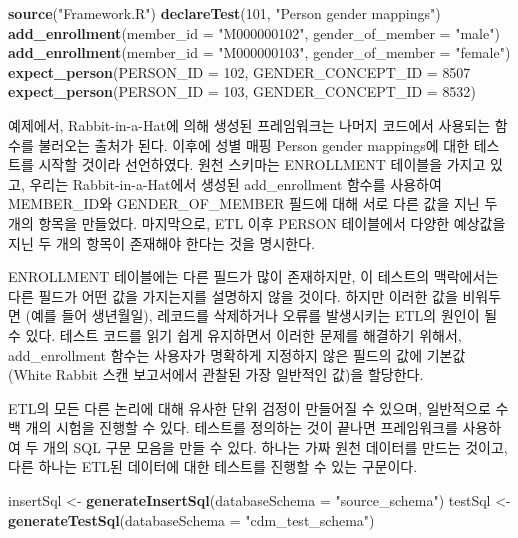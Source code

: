 \documentclass[10.5pt]{book}
\newenvironment{Shaded}{\begin{snugshade}}{\end{snugshade}}
\newcommand{\KeywordTok}[1]{\textcolor[rgb]{0.13,0.29,0.53}{\textbf{#1}}}
\newcommand{\DataTypeTok}[1]{\textcolor[rgb]{0.13,0.29,0.53}{#1}}
\newcommand{\DecValTok}[1]{\textcolor[rgb]{0.00,0.00,0.81}{#1}}
\newcommand{\StringTok}[1]{\textcolor[rgb]{0.31,0.60,0.02}{#1}}
\newcommand{\NormalTok}[1]{#1}
\theoremstyle{definition}
\theoremstyle{definition}
\theoremstyle{definition}
\theoremstyle{remark}
\begin{document}
\begin{Shaded}
\begin{Highlighting}[]
\KeywordTok{source}\NormalTok{(}\StringTok{"Framework.R"}\NormalTok{)}
\KeywordTok{declareTest}\NormalTok{(}\DecValTok{101}\NormalTok{, }\StringTok{"Person gender mappings"}\NormalTok{)}
\KeywordTok{add_enrollment}\NormalTok{(}\DataTypeTok{member_id =} \StringTok{"M000000102"}\NormalTok{, }\DataTypeTok{gender_of_member =} \StringTok{"male"}\NormalTok{)}
\KeywordTok{add_enrollment}\NormalTok{(}\DataTypeTok{member_id =} \StringTok{"M000000103"}\NormalTok{, }\DataTypeTok{gender_of_member =} \StringTok{"female"}\NormalTok{)}
\KeywordTok{expect_person}\NormalTok{(}\DataTypeTok{PERSON_ID =} \DecValTok{102}\NormalTok{, }\DataTypeTok{GENDER_CONCEPT_ID =} \DecValTok{8507}
\KeywordTok{expect_person}\NormalTok{(}\DataTypeTok{PERSON_ID =} \DecValTok{103}\NormalTok{, }\DataTypeTok{GENDER_CONCEPT_ID =} \DecValTok{8532}\NormalTok{)}
\end{Highlighting}
\end{Shaded}

예제에서, Rabbit-in-a-Hat에 의해 생성된 프레임워크는 나머지 코드에서
사용되는 함수를 불러오는 출처가 된다. 이후에 성별 매핑 Person gender
mappings에 대한 테스트를 시작할 것이라 선언하였다. 원천 스키마는
ENROLLMENT 테이블을 가지고 있고, 우리는 Rabbit-in-a-Hat에서 생성된
add\_enrollment 함수를 사용하여 MEMBER\_ID와 GENDER\_OF\_MEMBER 필드에
대해 서로 다른 값을 지닌 두 개의 항목을 만들었다. 마지막으로, ETL 이후
PERSON 테이블에서 다양한 예상값을 지닌 두 개의 항목이 존재해야 한다는
것을 명시한다.

ENROLLMENT 테이블에는 다른 필드가 많이 존재하지만, 이 테스트의
맥락에서는 다른 필드가 어떤 값을 가지는지를 설명하지 않을 것이다. 하지만
이러한 값을 비워두면 (예를 들어 생년월일), 레코드를 삭제하거나 오류를
발생시키는 ETL의 원인이 될 수 있다. 테스트 코드를 읽기 쉽게 유지하면서
이러한 문제를 해결하기 위해서, add\_enrollment 함수는 사용자가 명확하게
지정하지 않은 필드의 값에 기본값 (White Rabbit 스캔 보고서에서 관찰된
가장 일반적인 값)을 할당한다.

ETL의 모든 다른 논리에 대해 유사한 단위 검정이 만들어질 수 있으며,
일반적으로 수백 개의 시험을 진행할 수 있다. 테스트를 정의하는 것이
끝나면 프레임워크를 사용하여 두 개의 SQL 구문 모음을 만들 수 있다.
하나는 가짜 원천 데이터를 만드는 것이고, 다른 하나는 ETL된 데이터에 대한
테스트를 진행할 수 있는 구문이다.

\begin{Shaded}
\begin{Highlighting}[]
\NormalTok{insertSql <-}\StringTok{ }\KeywordTok{generateInsertSql}\NormalTok{(}\DataTypeTok{databaseSchema =} \StringTok{"source_schema"}\NormalTok{)}
\NormalTok{testSql <-}\StringTok{ }\KeywordTok{generateTestSql}\NormalTok{(}\DataTypeTok{databaseSchema =} \StringTok{"cdm_test_schema"}\NormalTok{)}
\end{Highlighting}
\end{Shaded}
\end{document}
